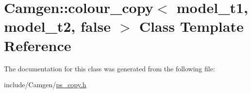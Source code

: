 \hypertarget{a00067}{}\section{Camgen\+:\+:colour\+\_\+copy$<$ model\+\_\+t1, model\+\_\+t2, false $>$ Class Template Reference}
\label{a00067}


The documentation for this class was generated from the following file\+:\begin{DoxyCompactItemize}
\item 
include/\+Camgen/\hyperlink{a00740}{ps\+\_\+copy.\+h}\end{DoxyCompactItemize}
